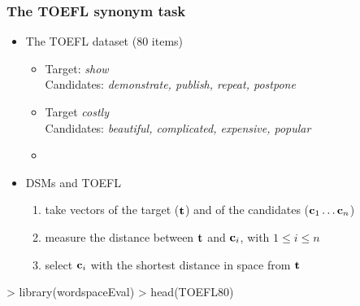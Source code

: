 \documentclass[t]{beamer} %
\begin{document}
\begin{frame}[fragile]
  \frametitle{The TOEFL synonym task}

  \begin{itemize}
  \item The TOEFL dataset (80 items)
    \begin{itemize}
    \item Target: \emph{show}\\
      Candidates: \emph{\alert<2->{demonstrate}, publish, repeat,  postpone}
    \item<2-> Target \emph{costly}\\
      Candidates: \emph{beautiful, complicated, \alert<3->{expensive}, popular}
    \item[]
    \end{itemize}   
  \item<3-> DSMs and TOEFL
    \begin{enumerate}
    \item take vectors of the target ($\Vector{t}$) and of the candidates
      ($\Vector{c}_1 \dots \Vector{c}_n$)
    \item measure the distance between $\Vector{t}$ and $\Vector{c}_i$, with
      $1 \leq i \leq n$ 
    \item select $\Vector{c}_i$ with the shortest distance in space from $\Vector{t}$
    \end{enumerate}
  \end{itemize}

  \vfill
\begin{Rcode}
> library(wordspaceEval)
> head(TOEFL80)    
\end{Rcode}
\end{frame}
\end{document}
